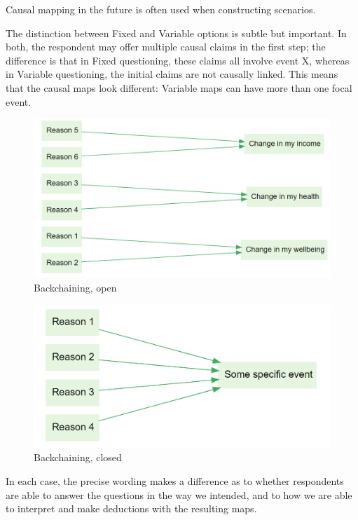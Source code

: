 \documentclass[
]{book}
\begin{document}
Causal mapping in the future is often used when constructing scenarios.

The distinction between Fixed and Variable options is subtle but important. In both, the respondent may offer multiple causal claims in the first step; the difference is that in Fixed questioning, these claims all involve event X, whereas in Variable questioning, the initial claims are not causally linked. This means that the causal maps look different: Variable maps can have more than one focal event.

\begin{figure}
\centering
\includegraphics{_assets/image-20210215085948227.png}
\caption{Backchaining, open}
\end{figure}

\begin{figure}
\centering
\includegraphics{_assets/image-20210215090049648.png}
\caption{Backchaining, closed}
\end{figure}

In each case, the precise wording makes a difference as to whether respondents are able to answer the questions in the way we intended, and to how we are able to interpret and make deductions with the resulting maps.
\end{document}
